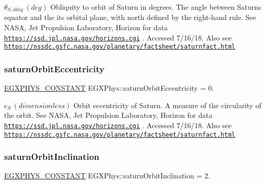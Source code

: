 $ \theta_{S,obliq} \ (deg)$ Obliquity to orbit of Saturn in degrees. The angle between Saturn\textquotesingle{}s equator and the it\textquotesingle{}s orbital plane, with north defined by the right-\/hand rule. See N\+A\+SA, Jet Propulsion Laboratory, Horizon for data \href{https://ssd.jpl.nasa.gov/horizons.cgi}{\tt https\+://ssd.\+jpl.\+nasa.\+gov/horizons.\+cgi} . Accessed 7/16/18. Also see \href{https://nssdc.gsfc.nasa.gov/planetary/factsheet/saturnfact.html}{\tt https\+://nssdc.\+gsfc.\+nasa.\+gov/planetary/factsheet/saturnfact.\+html} \mbox{\label{group___e_g_x_phys-_constants-_astrophysics-_solar_system-_saturn-_orbit_gaee5e3655c5c922893c68fa766331066c}} 
\subsubsection{\texorpdfstring{saturn\+Orbit\+Eccentricity}{saturnOrbitEccentricity}}
{\footnotesize\ttfamily \mbox{\hyperlink{group___e_g_x_phys-_constants-_macros_ga76980d288494ce1714c9ac68a95ba702}{E\+G\+X\+P\+H\+Y\+S\+\_\+\+C\+O\+N\+S\+T\+A\+NT}} E\+G\+X\+Phys\+::saturn\+Orbit\+Eccentricity = 0.}

$ e_{S} \ (dimensionless)$ Orbit eccentricity of Saturn. A measure of the circularity of the orbit. See N\+A\+SA, Jet Propulsion Laboratory, Horizon for data \href{https://ssd.jpl.nasa.gov/horizons.cgi}{\tt https\+://ssd.\+jpl.\+nasa.\+gov/horizons.\+cgi} . Accessed 7/16/18. Also see \href{https://nssdc.gsfc.nasa.gov/planetary/factsheet/saturnfact.html}{\tt https\+://nssdc.\+gsfc.\+nasa.\+gov/planetary/factsheet/saturnfact.\+html} \mbox{\label{group___e_g_x_phys-_constants-_astrophysics-_solar_system-_saturn-_orbit_ga1f950f67b22bb8bf638a3101de9828a8}} 
\subsubsection{\texorpdfstring{saturn\+Orbit\+Inclination}{saturnOrbitInclination}}
{\footnotesize\ttfamily \mbox{\hyperlink{group___e_g_x_phys-_constants-_macros_ga76980d288494ce1714c9ac68a95ba702}{E\+G\+X\+P\+H\+Y\+S\+\_\+\+C\+O\+N\+S\+T\+A\+NT}} E\+G\+X\+Phys\+::saturn\+Orbit\+Inclination = 2.}

